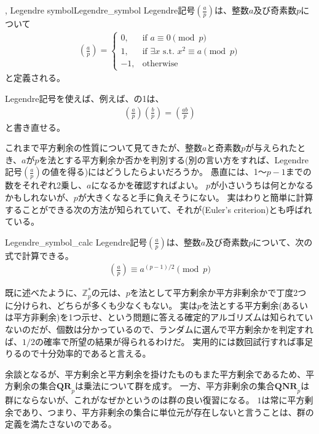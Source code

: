 \begin{Defi}{, Legendre symbol}{Legendre_symbol}
Legendre記号$\left(\frac{a}{p}\right)$は、整数$a$及び奇素数$p$について
\begin{align*}
\left(\frac{a}{p}\right) =
\begin{cases}
0, &\mbox{if }a \equiv 0 \pmod{p}\\
1, &\mbox{if }\exists x \mbox{ s.t. } x^2 \equiv a \pmod{p}\\
-1, &\mbox{otherwise}
\end{cases}
\end{align*}
と定義される。
\end{Defi}

Legendre記号を使えば、例えば、の1は、
\begin{align*}
\left(\frac{a}{p}\right)\left(\frac{b}{p}\right) = \left(\frac{ab}{p}\right)
\end{align*}
と書き直せる。

これまで平方剰余の性質について見てきたが、整数$a$と奇素数$p$が与えられたとき、$a$が$p$を法とする平方剰余か否かを判別する(別の言い方をすれば、Legendre記号$\left(\frac{a}{p}\right)$の値を得る)にはどうしたらよいだろうか。
愚直には、1～$p-1$までの数をそれぞれ2乗し、$a$になるかを確認すればよい。
$p$が小さいうちは何とかなるかもしれないが、$p$が大きくなると手に負えそうにない。
実はわりと簡単に計算することができる次の方法が知られていて、それが(Euler's criterion)とも呼ばれている。

\begin{Prop}{}{Legendre_symbol_calc}
Legendre記号$\left(\frac{a}{p}\right)$は、整数$a$及び奇素数$p$について、次の式で計算できる。
\begin{align*}
\left(\frac{a}{p}\right) \equiv a^{(p-1)/2} \pmod{p}
\end{align*}
\end{Prop}

既に述べたように、$\mathbb{Z}_p^*$の元は、$p$を法として平方剰余か平方非剰余かで丁度2つに分けられ、どちらが多くも少なくもない。
実は$p$を法とする平方剰余(あるいは平方非剰余)を1つ示せ、という問題に答える確定的アルゴリズムは知られていないのだが、個数は分かっているので、ランダムに選んで平方剰余かを判定すれば、$1/2$の確率で所望の結果が得られるわけだ。
実用的には数回試行すれば事足りるので十分効率的であると言える。

余談となるが、平方剰余と平方剰余を掛けたものもまた平方剰余であるため、平方剰余の集合$\mathbf{QR}_p$は乗法について群を成す。
一方、平方非剰余の集合$\mathbf{QNR}_p$は群にならないが、これがなぜかというのは群の良い復習になる。
$1$は常に平方剰余であり、つまり、平方非剰余の集合に単位元が存在しないと言うことは、群の定義を満たさないのである。

